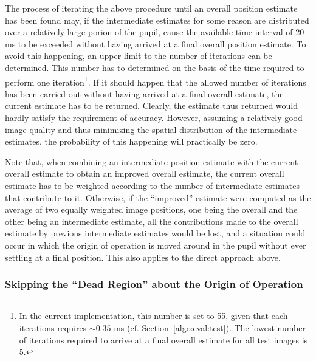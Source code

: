 The process of iterating the above procedure until an overall position
estimate has been found may, if the intermediate estimates for some
reason are distributed over a relatively large porion of the pupil,
cause the available time interval of 20 ms to be exceeded without
having arrived at a final overall position estimate.  To avoid this
happening, an upper limit to the number of iterations can be
determined.  This number has to determined on the basis of the time
required to perform one iteration\footnote{\label{pg:iterationtime}In
  the current implementation, this number is set to 55, given that
  each iterations requires $\sim 0.35$ ms (cf.
  Section~\ref{algo:eval:test}).  The lowest number of iterations
  required to arrive at a final overall estimate for all test images
  is 5.}.  If it should happen that the allowed number of iterations
has been carried out without having arrived at a final overall
estimate, the current estimate has to be returned.  Clearly, the
estimate thus returned would hardly satisfy the requirement of
accuracy.  However, assuming a relatively good image quality and thus
minimizing the spatial distribution of the intermediate estimates, the
probability of this happening will practically be zero.

Note that, when combining an intermediate position estimate with the
current overall estimate to obtain an improved overall estimate, the
current overall estimate has to be weighted according to the number of
intermediate estimates that contribute to it.  Otherwise, if the
``improved'' estimate were computed as the average of two equally
weighted image positions, one being the overall and the other being an
intermediate estimate, all the contributions made to the overall
estimate by previous intermediate estimates would be lost, and a
situation could occur in which the origin of operation is moved around
in the pupil without ever settling at a final position.  This also
applies to the direct approach above.

\subsubsection{Skipping the ``Dead Region'' about the Origin of
  Operation}
\label{pg:dead}

